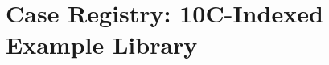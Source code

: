 
\chapter{Case Registry: 10C-Indexed Example Library}
\label{app:cases}

\begin{abstract}
This appendix presents the key concepts and formalizations for Case Registry: 10C-Indexed Example Library.
It provides theoretical foundations, practical applications, and integration
points with other components of the Evidence-Based Framework (EBF).
The content supports decision-making and behavioral analysis in the context
of complementarity and context-dependent outcomes.
\end{abstract}


